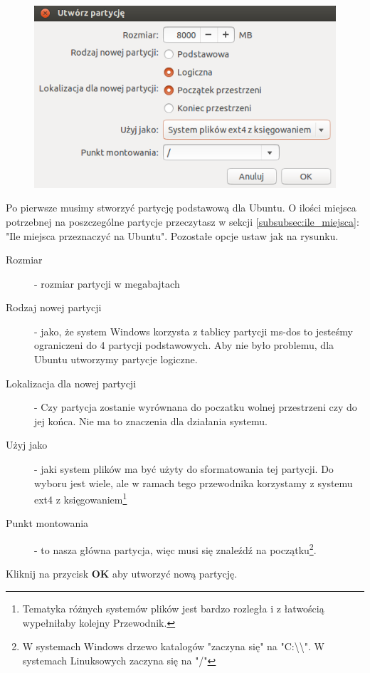 \begin{figure}
		\includegraphics[scale=0.8]{images/instalator_partycjonowanie_gparted_dodaj_root.png}
\end{figure}
Po pierwsze musimy stworzyć partycję podstawową dla Ubuntu. O ilości miejsca potrzebnej na poszczególne partycje przeczytasz w sekcji \ref{subsubsec:ile_miejsca}: "Ile miejsca przeznaczyć na Ubuntu". Pozostałe opcje ustaw jak na rysunku.
\begin{description}
\item[Rozmiar] - rozmiar partycji w megabajtach
\item[Rodzaj nowej partycji] - jako, że system Windows korzysta z tablicy partycji ms-dos to jesteśmy ograniczeni do 4 partycji podstawowych. Aby nie było problemu, dla Ubuntu utworzymy partycje logiczne.
\item[Lokalizacja dla nowej partycji] - Czy partycja zostanie wyrównana do poczatku wolnej przestrzeni czy do jej końca. Nie ma to znaczenia dla działania systemu.
\item[Użyj jako] - jaki system plików ma być użyty do sformatowania tej partycji. Do wyboru jest wiele, ale w ramach tego przewodnika korzystamy z systemu ext4 z księgowaniem\footnote{Tematyka różnych systemów plików jest bardzo rozległa i z łatwością wypełniłaby kolejny Przewodnik.}
\item[Punkt montowania] - to nasza główna partycja, więc musi się znaleźdź na początku\footnote{W systemach Windows drzewo katalogów "zaczyna się" na "C:\textbackslash\textbackslash". W systemach Linuksowych zaczyna się na "/"}.
\end{description}
Kliknij na przycisk \textbf{OK} aby utworzyć nową partycję.
\clearpage
